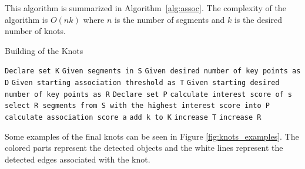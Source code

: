 This algorithm is summarized in Algorithm~\ref{alg:assoc}. The complexity of the algorithm is $O(nk)$ where $n$ is the number of segments and $k$ is the desired number of knots.

\begin{algorithm}[H]
\caption{Building of the Knots}\label{alg:assoc}
\begin{algorithmic}
\State \texttt{Declare set K}
\State \texttt{Given segments in S}
\State \texttt{Given desired number of key points as D}
\State \texttt{Given starting association threshold as T}
\State \texttt{Given starting desired number of key points as R}
    \State \texttt{Declare set P}
        \State \texttt{calculate interest score of s}
    \EndFor
    \State \texttt{select R segments from S with the highest interest score into P}
            \State \texttt{calculate association score a}
            \EndIf
        \EndFor
        \State \texttt{add k to K}
    \EndFor
    \State \texttt{increase T}
    \State \texttt{increase R}
\EndWhile
\end{algorithmic}
\end{algorithm}

Some examples of the final knots can be seen in Figure \ref{fig:knots_examples}. The colored parts represent the detected objects and the white lines represent the detected edges associated with the knot.

